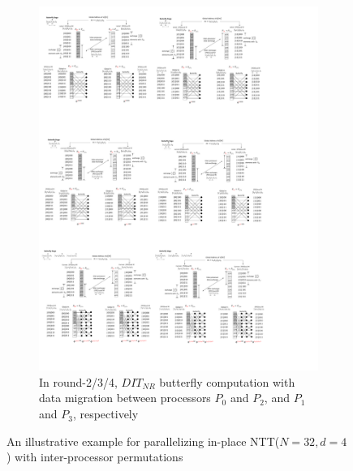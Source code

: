\documentclass{iacrtrans}
\theoremstyle{plain}
\begin{document}
\begin{figure}[!tb]
\begin{subfigure}[b]{\textwidth}
\includegraphics[width=\textwidth]{./fig/DataSwapWithPerm3.pdf}
\caption{In round-2/3/4, $DIT_{NR}$ butterfly computation with data migration between processors $P_0$ and $P_2$, and $P_1$ and $P_3$, respectively}\label{fig:dataswap_with_perm3}
\end{subfigure}
\caption{An illustrative example for parallelizing in-place NTT($N=32,d=4$) with inter-processor permutations}\label{fig:dataswap_with_perm}
\end{figure}
\end{document}
